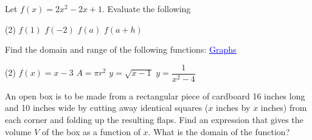 \documentclass[../mathNotesPreamble]{subfiles}
\begin{document}
  \begin{minipage}{0.495\linewidth}
    \begin{center}
    \end{center}
  \end{minipage}

  \begin{ex*}
    Let $f(x)=2x^2-2x+1$. Evaluate the following
  \end{ex*}
  \begin{extasks}[after-item-skip=\stretch{1}](2)
    \task $f(1)$
    \task $f(-2)$
    \task $f(a)$
    \task $f(a+h)$
  \end{extasks}
  \pagebreak

  \begin{ex*}
    Find the domain and range of the following functions:
    \href{https://www.desmos.com/calculator/tbly1gs9ye}{\textcolor{blue}{\underline{Graphs}}}
  \end{ex*}
  \begin{extasks}[after-item-skip=\stretch{1}](2)
    \task $f(x)=x-3$
    \task $A=\pi r^2$
    \task $y=\sqrt{x-1}$
    \task $y=\dfrac{1}{x^2-4}$
  \end{extasks}
  \pagebreak

  \begin{ex*}
    An open box is to be made from a rectangular piece of cardboard 16 inches long and 10 inches wide by cutting away identical squares ($x$ inches by $x$ inches) from each corner and folding up the resulting flaps. Find an expression that gives the volume $V$ of the box as a function of $x$. What is the domain of the function?
  \end{ex*}
  \vspace*{0.5\baselineskip}
\end{document}
